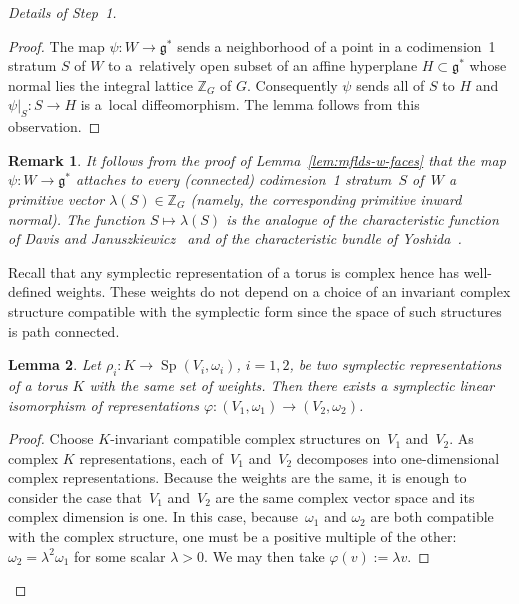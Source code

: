 \documentclass[10pt,a4paper]{amsart}
\numberwithin{equation}{section}
\newtheorem{Lemma}{Lemma}[section]
\newtheorem{Remark}[Lemma]{Remark}
\begin{document}
\begin{proof}[Details of Step~1]
\begin{proof}
  The map $\psi\colon W\to {\mathfrak g}^*$  sends a
  neighborhood of a point in a codimension~1 stratum $S$ of $W$ to a~relatively open subset of an af\/f\/ine hyperplane $H\subset {\mathfrak g}^*$
  whose normal lies the integral lattice ${\mathbb Z}_G$ of $G$.  Consequently
  $\psi$ sends all of $S$ to $H$ and $\psi|_S\colon S\to H$ is a~local dif\/feomorphism.  The lemma follows from this observation.
\end{proof}

\begin{Remark}
  It follows from the proof of Lemma~\ref{lem:mflds-w-faces} that the
  map $\psi\colon W\to {\mathfrak g}^*$ attaches to every (connected) codimesion~1
  stratum~$S$ of~$W$ a primitive vector $\lambda(S)\in {\mathbb Z}_G$
  (namely, the corresponding primitive inward normal).
  The function $S\mapsto \lambda(S)$ is the
  analogue of the characteristic function of Davis and Januszkiewicz~\cite{DJ} and of the characteristic bundle of Yoshida~\cite{Y}.
\end{Remark}

Recall that any symplectic representation of a torus is complex hence
has well-def\/ined weights.  These weights do not depend on a choice of
an invariant complex structure compatible with the symplectic form
since the space of such structures is path connected.

\begin{Lemma}\label{lemma:step1.2}
  Let $\rho_i\colon K\to \operatorname{Sp}(V_i,\omega_i)$, $i=1,2$, be two symplectic
  representations of a torus $K$ with the same set of weights.
  Then there exists a symplectic linear isomorphism of representations
  $\varphi\colon  (V_1,\omega_1) \to (V_2,\omega_2)$.
\end{Lemma}

\begin{proof}
  Choose $K$-invariant compatible complex structures on~$V_1$ and~$V_2$.
  As complex $K$ representations, each of~$V_1$ and~$V_2$
  decomposes into one-dimensional complex representations.
  Because the weights are the same, it is enough to consider the case
  that~$V_1$ and~$V_2$ are the same complex vector space
  and its complex dimension is one.
  In this case, because~$\omega_1$ and $\omega_2$ are both compatible
  with the complex structure, one must be a positive multiple of the other:
  $\omega_2 = \lambda^2 \omega_1$ for some scalar $\lambda >0$.
  We may then take $\varphi(v) := \lambda v$.
\end{proof}


\end{proof}
\end{document}
